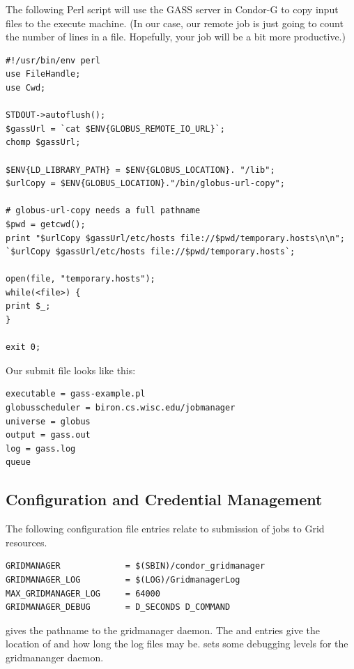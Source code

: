 The following Perl script will use the GASS server in Condor-G
to copy input files to the execute machine.
(In our case, our remote job
is just going to count the number of lines in a file.
Hopefully, your job will be a bit more productive.)

\begin{verbatim}
#!/usr/bin/env perl
use FileHandle;
use Cwd;

STDOUT->autoflush();
$gassUrl = `cat $ENV{GLOBUS_REMOTE_IO_URL}`;
chomp $gassUrl;

$ENV{LD_LIBRARY_PATH} = $ENV{GLOBUS_LOCATION}. "/lib";
$urlCopy = $ENV{GLOBUS_LOCATION}."/bin/globus-url-copy";

# globus-url-copy needs a full pathname
$pwd = getcwd();
print "$urlCopy $gassUrl/etc/hosts file://$pwd/temporary.hosts\n\n";
`$urlCopy $gassUrl/etc/hosts file://$pwd/temporary.hosts`;

open(file, "temporary.hosts");
while(<file>) {
print $_;
}

exit 0;
\end{verbatim}

Our submit file looks like this:

\begin{verbatim}
executable = gass-example.pl
globusscheduler = biron.cs.wisc.edu/jobmanager
universe = globus
output = gass.out
log = gass.log
queue
\end{verbatim}
\subsection{\label{sec:Condor-G-Credentials}Configuration and Credential Management}

The following configuration file entries relate to submission of
jobs to Grid resources.

\begin{verbatim}
GRIDMANAGER             = $(SBIN)/condor_gridmanager
GRIDMANAGER_LOG         = $(LOG)/GridmanagerLog
MAX_GRIDMANAGER_LOG     = 64000
GRIDMANAGER_DEBUG       = D_SECONDS D_COMMAND
\end{verbatim} 

gives the pathname to the gridmanager daemon.
The 
and
entries give the location of and how long
the log files may be.
sets some debugging levels for the gridmananger daemon.


